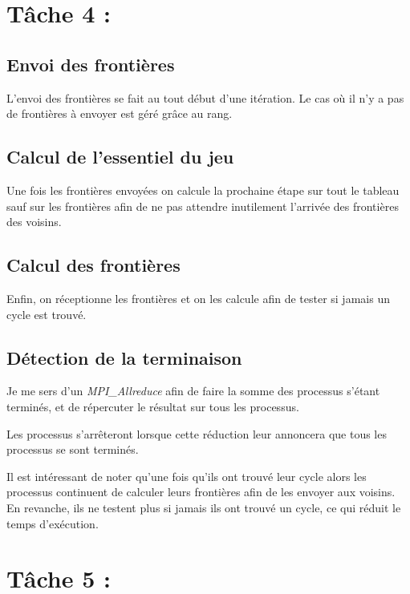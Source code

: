 \documentclass{article}
\begin{document}
\section*{Tâche 4 :}

\subsection{Envoi des frontières}

L'envoi des frontières se fait au tout début d'une itération. Le cas où il n'y a pas de frontières à envoyer est géré grâce au rang.

\subsection{Calcul de l'essentiel du jeu}

Une fois les frontières envoyées on calcule la prochaine étape sur tout le tableau sauf sur les frontières afin de ne pas attendre inutilement l'arrivée des frontières des voisins.

\subsection{Calcul des frontières}

Enfin, on réceptionne les frontières et on les calcule afin de tester si jamais un cycle est trouvé.

\subsection{Détection de la terminaison}

Je me sers d'un \textit{MPI\_Allreduce} afin de faire la somme des processus s'étant terminés, et de répercuter le résultat sur tous les processus.

Les processus s'arrêteront lorsque cette réduction leur annoncera que tous les processus se sont terminés.

\medskip

Il est intéressant de noter qu'une fois qu'ils ont trouvé leur cycle alors les processus continuent de calculer leurs frontières afin de les envoyer aux voisins. En revanche, ils ne testent plus si jamais ils ont trouvé un cycle, ce qui réduit le temps d'exécution.

\section*{Tâche 5 :}
\end{document}
